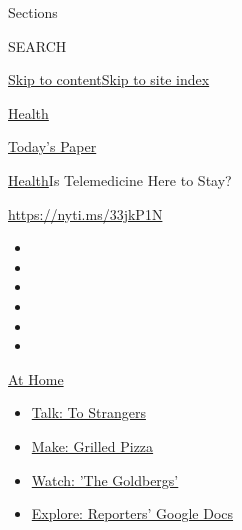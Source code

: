 Sections

SEARCH

\protect\hyperlink{site-content}{Skip to
content}\protect\hyperlink{site-index}{Skip to site index}

\href{https://www.nytimes3xbfgragh.onion/section/health}{Health}

\href{https://myaccount.nytimes3xbfgragh.onion/auth/login?response_type=cookie\&client_id=vi}{}

\href{https://www.nytimes3xbfgragh.onion/section/todayspaper}{Today's
Paper}

\href{/section/health}{Health}\textbar{}Is Telemedicine Here to Stay?

\url{https://nyti.ms/33jkP1N}

\begin{itemize}
\item
\item
\item
\item
\item
\item
\end{itemize}

\href{https://www.nytimes3xbfgragh.onion/spotlight/at-home?action=click\&pgtype=Article\&state=default\&region=TOP_BANNER\&context=at_home_menu}{At
Home}

\begin{itemize}
\tightlist
\item
  \href{https://www.nytimes3xbfgragh.onion/2020/08/03/well/family/the-benefits-of-talking-to-strangers.html?action=click\&pgtype=Article\&state=default\&region=TOP_BANNER\&context=at_home_menu}{Talk:
  To Strangers}
\item
  \href{https://www.nytimes3xbfgragh.onion/2020/08/01/at-home/coronavirus-make-pizza-on-a-grill.html?action=click\&pgtype=Article\&state=default\&region=TOP_BANNER\&context=at_home_menu}{Make:
  Grilled Pizza}
\item
  \href{https://www.nytimes3xbfgragh.onion/2020/07/31/arts/television/goldbergs-abc-stream.html?action=click\&pgtype=Article\&state=default\&region=TOP_BANNER\&context=at_home_menu}{Watch:
  'The Goldbergs'}
\item
  \href{https://www.nytimes3xbfgragh.onion/interactive/2020/at-home/even-more-reporters-editors-diaries-lists-recommendations.html?action=click\&pgtype=Article\&state=default\&region=TOP_BANNER\&context=at_home_menu}{Explore:
  Reporters' Google Docs}
\end{itemize}

